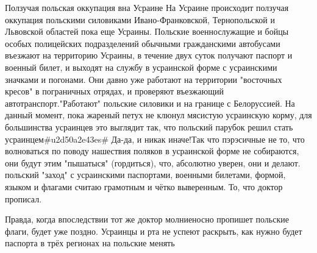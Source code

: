 Ползучая польская оккупация вна Усраине  На Усраине происходит ползучая
оккупация польскими силовиками Ивано-Франковской, Тернопольской и Львовской
областей пока еще Усраины. Польские военнослужащие и бойцы особых полицейских
подразделений обычными гражданскими автобусами въезжают на территорию Усраины,
в течение двух суток получают паспорт и военный билет, и выходят на службу в
усраинской форме с усраинскими значками и погонами. Они давно уже работают на
территории "восточных кресов" в пограничных отрядах, и проверяют въезжающий
автотранспорт."Работают" польские силовики и на границе с Белоруссией. На
данный момент, пока жареный петух не клюнул мясистую усраинскую корму, для
большинства усраинцев это выглядит так, что польский парубок решил стать
усраинцем#u2d50a2e43es# Да-да, и никак иначе!Так что пэрэсичные не то, что
волноваться по поводу нашествия поляков в усраинской форме не собираются, они
будут этим "пышатыся" (гордиться), что, абсолютно уверен, они и делают.
польский "заход" с усраинскими паспортами, военными билетами, формой, языком и
флагами считаю грамотным и чётко выверенным. То, что доктор прописал.

Правда, когда впоследствии тот же доктор молниеносно пропишет польские флаги,
будет уже поздно. Усраинцы и рта не успеют раскрыть, как нужно будет паспорта в
трёх регионах на польские менять


